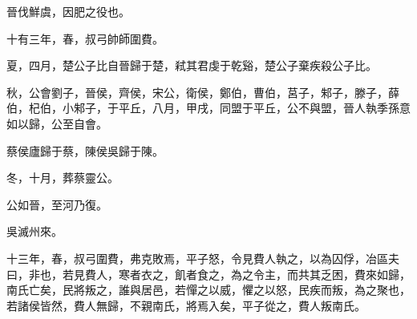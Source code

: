 \begin{pinyinscope}
晉伐鮮虞，因肥之役也。

十有三年，春，叔弓帥師圍費。

夏，四月，楚公子比自晉歸于楚，弒其君虔于乾谿，楚公子棄疾殺公子比。

秋，公會劉子，晉侯，齊侯，宋公，衛侯，鄭伯，曹伯，莒子，邾子，滕子，薛伯，杞伯，小邾子，于平丘，八月，甲戌，同盟于平丘，公不與盟，晉人執季孫意如以歸，公至自會。

蔡侯廬歸于蔡，陳侯吳歸于陳。

冬，十月，葬蔡靈公。

公如晉，至河乃復。

吳滅州來。

十三年，春，叔弓圍費，弗克敗焉，平子怒，令見費人執之，以為囚俘，冶區夫曰，非也，若見費人，寒者衣之，飢者食之，為之令主，而共其乏困，費來如歸，南氏亡矣，民將叛之，誰與居邑，若憚之以威，懼之以怒，民疾而叛，為之聚也，若諸侯皆然，費人無歸，不親南氏，將焉入矣，平子從之，費人叛南氏。


\end{pinyinscope}
